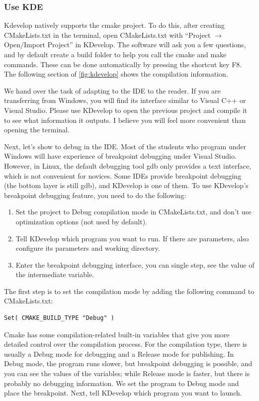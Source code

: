\subsubsection{Use KDE}
Kdevelop natively supports the cmake project. To do this, after creating CMakeLists.txt in the terminal, open CMakeLists.txt with ``Project $\rightarrow$Open/Import Project'' in KDevelop. The software will ask you a few questions, and by default create a build folder to help you call the cmake and make commands. These can be done automatically by pressing the shortcut key F8. The following section of \autoref{fig:kdevelop} shows the compilation information.

We hand over the task of adapting to the IDE to the reader. If you are transferring from Windows, you will find its interface similar to Visual C++ or Visual Studio. Please use KDevelop to open the previous project and compile it to see what information it outputs. I believe you will feel more convenient than opening the terminal.

Next, let's show to debug in the IDE. Most of the students who program under Windows will have experience of breakpoint debugging under Visual Studio. However, in Linux, the default debugging tool gdb only provides a text interface, which is not convenient for novices. Some IDEs provide breakpoint debugging (the bottom layer is still gdb), and KDevelop is one of them. To use KDevelop's breakpoint debugging feature, you need to do the following:

\begin{enumerate}
    \item Set the project to Debug compilation mode in CMakeLists.txt, and don't use optimization options (not used by default).
    \item Tell KDevelop which program you want to run. If there are parameters, also configure its parameters and working directory.
    \item Enter the breakpoint debugging interface, you can single step, see the value of the intermediate variable.
\end{enumerate}


The first step is to set the compilation mode by adding the following command to CMakeLists.txt:
\begin{lstlisting}[caption=slambook2/ch2/CMakeLists.txt]
Set( CMAKE_BUILD_TYPE "Debug" )
\end{lstlisting}

Cmake has some compilation-related built-in variables that give you more detailed control over the compilation process. For the compilation type, there is usually a Debug mode for debugging and a Release mode for publishing. In Debug mode, the program runs slower, but breakpoint debugging is possible, and you can see the values of the variables; while Release mode is faster, but there is probably no debugging information. We set the program to Debug mode and place the breakpoint. Next, tell KDevelop which program you want to launch.

